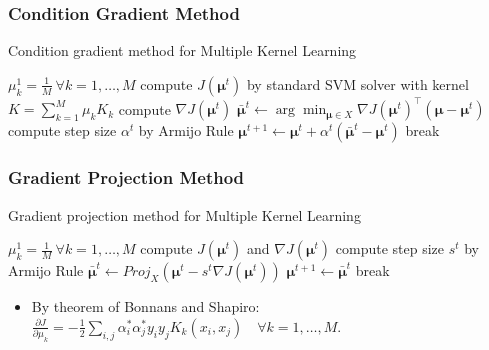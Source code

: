 \documentclass{beamer}
\begin{document}
	\begin{frame}
		\frametitle{Condition Gradient Method}
		\begin{algorithm}[H]
        \caption{Condition gradient method for Multiple Kernel Learning}	
        \begin{algorithmic}
    	    \Require $\mu_k^1=\frac{1}{M} ~\forall k=1,\ldots,M$
    	        \State compute $J(\boldsymbol{\boldsymbol{\mu}}^t)$ by standard SVM solver with kernel $K=\sum_{k=1}^M \mu_k K_k$
    	        \State compute $\nabla J(\boldsymbol{\mu}^t)$
    	        \State $\bar{\boldsymbol{\mu}}^t\gets \arg\min_{\boldsymbol{\mu}\in X} \nabla J(\boldsymbol{\mu}^t)^\top(\boldsymbol{\mu}-\boldsymbol{\mu}^t)$
    	        \State compute step size $\alpha^t$
    	        \Comment by Armijo Rule
    	        \State $\boldsymbol{\boldsymbol{\mu}}^{t+1}\gets\boldsymbol{\boldsymbol{\mu}}^t+\alpha^t(\bar{\boldsymbol{\boldsymbol{\mu}}}^t-\boldsymbol{\boldsymbol{\mu}}^t)$
    	        	\State break
    	        \EndIf
    	    \EndFor
        \end{algorithmic}
    	\end{algorithm}
	\end{frame}
	
	\begin{frame}
		\frametitle{Gradient Projection Method}
		\begin{algorithm}[H]
        \caption{Gradient projection method for Multiple Kernel Learning}
        \begin{algorithmic}
            \Require $\mu_k^1=\frac{1}{M}~\forall k=1,\ldots,M$
                \State compute $J(\boldsymbol{\mu}^t)$ and $\nabla J(\boldsymbol{\mu}^t)$
                \State compute step size $s^t$
                \Comment by Armijo Rule
                \State $\bar{\boldsymbol{\mu}}^t\gets Proj_X(\boldsymbol{\mu}^t-s^t\nabla J(\boldsymbol{\mu}^t))$      
                \State $\boldsymbol{\mu}^{t+1}\gets\bar{\boldsymbol{\mu}}^t$
                	\State break
                \EndIf
            \EndFor
        \end{algorithmic}
    	\end{algorithm}
    	\pause
    	\begin{itemize}
    		\item By theorem of Bonnans and Shapiro:\\
				  $\frac{\partial J}{\partial \mu_k}=-\frac{1}{2}\sum_{i,j}\alpha_i^\ast\alpha_j^\ast y_i y_j K_k(x_i,x_j)\quad \forall k=1,\ldots,M$.
    	\end{itemize}
    	
	\end{frame}
	
\end{document}
